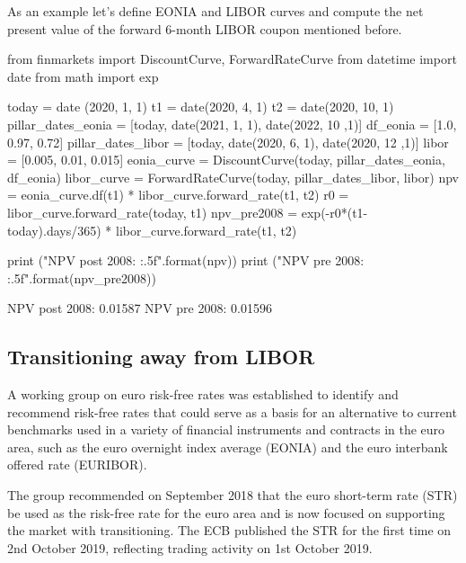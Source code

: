 %
%

As an example let's define EONIA and LIBOR curves and compute the net present value of the forward 6-month LIBOR coupon mentioned before.

\begin{ipython}
from finmarkets import DiscountCurve, ForwardRateCurve
from datetime import date
from math import exp 

today = date (2020, 1, 1)
t1 = date(2020, 4, 1)
t2 = date(2020, 10, 1)
pillar_dates_eonia = [today, date(2021, 1, 1), date(2022, 10 ,1)]
df_eonia = [1.0, 0.97, 0.72]
pillar_dates_libor = [today, date(2020, 6, 1), date(2020, 12 ,1)]
libor = [0.005, 0.01, 0.015]
eonia_curve = DiscountCurve(today, pillar_dates_eonia, df_eonia)
libor_curve = ForwardRateCurve(today, pillar_dates_libor, libor)
npv = eonia_curve.df(t1) * libor_curve.forward_rate(t1, t2)
r0 = libor_curve.forward_rate(today, t1)
npv_pre2008 = exp(-r0*(t1-today).days/365) * libor_curve.forward_rate(t1, t2)

print ("NPV post 2008: {:.5f}".format(npv))
print ("NPV pre 2008: {:.5f}".format(npv_pre2008))
\end{ipython}
\begin{ioutput}
NPV post 2008: 0.01587
NPV pre 2008: 0.01596
\end{ioutput}

\subsection{Transitioning away from LIBOR~\cite{bib:str}}
A working group on euro risk-free rates was established to identify and recommend risk-free rates that could serve as a basis for an alternative to current benchmarks used in a variety of financial
instruments and contracts in the euro area, such as the euro overnight index average (EONIA) and the euro interbank offered rate (EURIBOR). 

The group recommended on September 2018 that the euro short-term rate (STR) be used as the risk-free rate for the euro area and is now focused on supporting the market with transitioning.
The ECB published the STR for the first time on 2nd October 2019, reflecting trading activity on 1st October 2019.

